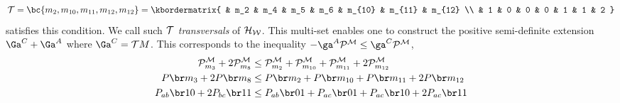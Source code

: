 \documentclass[aps, 10pt, english, twoside, pra, nofootinbib, longbibliography]{revtex4-1}
\begin{document}
\begin{example}
        \[ \trans = \bc{m_{2}, m_{10}, m_{11}, m_{12}, m_{12}} = \kbordermatrix{
            & m_2 & m_4 & m_5 & m_6 & m_{10} & m_{11} & m_{12} \\
            &   1 &   0 &   0 &   0 &      1 &      1 &      2
        } \]
        satisfies this condition. We call such $\mathcal{T}$ \textit{transversals} of $\mathcal{H}_{\mathcal{W}}$. This multi-set enables one to construct the positive semi-definite extension $\Ga^{C} + \Ga^{A}$ where $\Ga^{C} = \trans \tcdot M$. This corresponds to the inequality $- \ga^{A} \tcdot \probvec^{\mscenario} \leq \ga^{C} \tcdot \probvec^{\mscenario}$,
        \begin{align*}
        \probvec^{\mscenario}_{m_3} + 2 \probvec^{\mscenario}_{m_8} &\leq \probvec^{\mscenario}_{m_{2}} + \probvec^{\mscenario}_{m_{10}} + \probvec^{\mscenario}_{m_{11}} + 2 \probvec^{\mscenario}_{m_{12}} \\
        \prob[][m_3] + 2 \prob[][m_8] &\leq \prob[][m_{2}] + \prob[][m_{10}] + \prob[][m_{11}] + 2 \prob[][m_{12}] \\
        \prob[ab][10] + 2 \prob[bc][11] &\leq \prob[ab][01] + \prob[ac][01] + \prob[ac][10] + 2 \prob[ac][11]
        \end{align*}
    \end{example}
\end{document}
